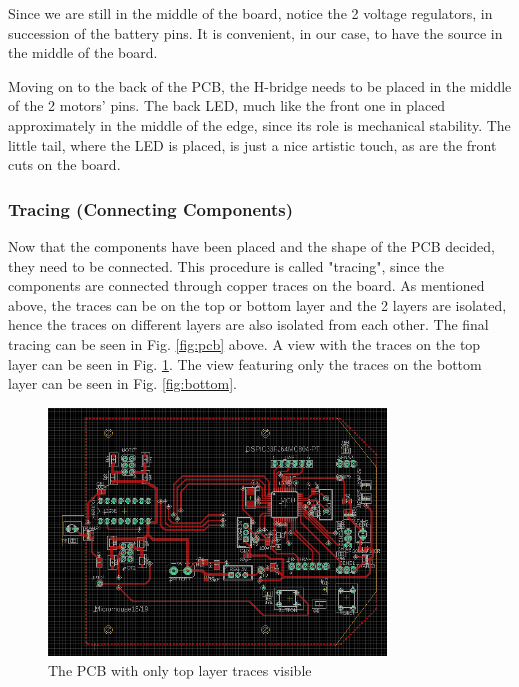 Since we are still in the middle of the board, notice the 2 voltage regulators, in succession of the battery pins. It is convenient, in our case, to have the source in the middle of the board.

Moving on to the back of the PCB, the H-bridge needs to be placed in the middle of the 2 motors' pins. The back LED, much like the front one in placed approximately in the middle of the edge, since its role is mechanical stability. The little tail, where the LED is placed, is just a nice artistic touch, as are the front cuts on the board.


\subsubsection{Tracing (Connecting Components)}

Now that the components have been placed and the shape of the PCB decided, they need to be connected. This procedure is called "tracing", since the components are connected through copper traces on the board.
As mentioned above, the traces can be on the top or bottom layer and the 2 layers are isolated, hence the traces on different layers are also isolated from each other. 
The final tracing can be seen in Fig. \ref{fig:pcb} above.
A view with the traces on the top layer can be seen in Fig. \ref{fig:top}. The view featuring only the traces on the bottom layer can be seen in Fig. \ref{fig:bottom}.

\begin{figure}[htb]
    \centering
    \includegraphics[width=0.8\textwidth]{figures/hardware/PCB_Top.PNG}
    \caption{The PCB with only top layer traces visible}
    \label{fig:top}
\end{figure}

